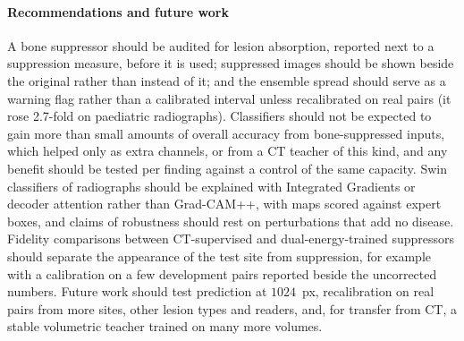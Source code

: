 \paragraph{Recommendations and future work} A bone suppressor should be audited for lesion absorption, reported next to a suppression
measure, before it is used; suppressed images should be shown beside the original rather than instead of it; and the ensemble spread should
serve as a warning flag rather than a calibrated interval unless recalibrated on real pairs (it rose 2.7-fold on paediatric radiographs).
Classifiers should not be expected to gain more than small amounts of overall accuracy from bone-suppressed inputs, which helped only as
extra channels, or from a CT teacher of this kind, and any benefit should be tested per finding against a control of the same capacity. Swin classifiers of radiographs should be explained with Integrated
Gradients or decoder attention rather than Grad-CAM++, with maps scored against expert boxes, and claims of robustness should rest on
perturbations that add no disease. Fidelity comparisons between CT-supervised and dual-energy-trained suppressors should separate the
appearance of the test site from suppression, for example with a calibration on a few development pairs reported beside the uncorrected
numbers. Future work should test prediction at $1024$~px, recalibration on real pairs from more sites, other
lesion types and readers, and, for transfer from CT, a stable volumetric teacher trained on many more volumes.
